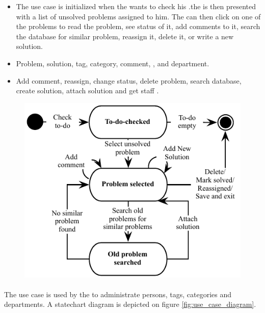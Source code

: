\begin{itemize}
\item {} The use case is initialized when the \astaff[] wants to check his \todolist[].the \astaff[] is then presented with a list of unsolved problems assigned to him. The \astaff[] can then click on one of the problems to read the problem, see status of it, add comments to it, search the database for similar problem, reassign it, delete it, or write a new solution. 

\item {} Problem, solution, tag, category, comment, \client[], \staff[] and department. 

\item {} Add comment, reassign, change status, delete problem, search database, create solution, attach solution and get staff \todolist{}.
\end{itemize}

\begin{figure}[htbp]
\begin{center}
 \includegraphics[scale=0.8]{input/application_domain_analysis/solve_problem_use_case}
\label{fig:solve_problem_use_case}
\end{center}
\end{figure}


\paragraph{\tucadmin[c]} The use case \tucadmin[] is used by the \sadmin[] to administrate persons, tags, categories and departments. A statechart diagram is depicted on figure \ref{fig:use_case_diagram}.


